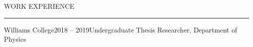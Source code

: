 \documentclass{short_resume} %
\renewenvironment{rSection}[1]{
	\sectionskip
	\textcolor{RoyalPurple}{\MakeUppercase{#1}}
	\sectionlineskip
	\hrule
	\begin{list}{}{
			\setlength{\leftmargin}{1.5em}
		}
		\item[]
	}{
	\end{list}
}
\begin{document}
\begin{rSection}{Work Experience}
\begin{rSubsection}{Williams College}{2018 -- 2019}{Undergraduate Thesis Researcher, Department of Physics}{}
		\end{rSubsection}

	\end{rSection}
		
	\vspace{-1em}
\newcommand{\CC}{C\nolinebreak\hspace{-.05em}\raisebox{.4ex}{\tiny\bf +}\nolinebreak\hspace{-.10em}\raisebox{.4ex}{\tiny\bf +}}
\def\CC{{C\nolinebreak[4]\hspace{-.05em}\raisebox{.4ex}{\tiny\bf ++}}}
\end{document}
